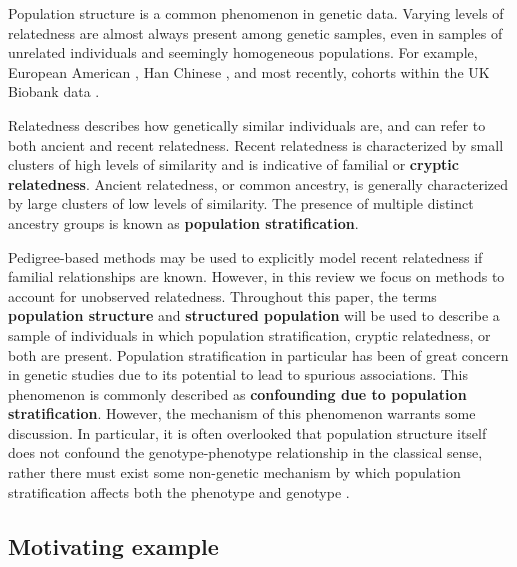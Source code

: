Population structure is a common phenomenon in genetic data. Varying levels of relatedness are almost always present among genetic samples, even in samples of unrelated individuals and seemingly homogeneous populations. For example, European American \cite{campbell2005demonstrating}, Han Chinese \cite{xu2009genomic, chen2009genetic}, and most recently, cohorts within the UK Biobank data \cite{haworth2019apparent}.

Relatedness describes how genetically similar individuals are, and can refer to both ancient and recent relatedness.  Recent relatedness is characterized by small clusters of high levels of similarity and is indicative of familial or \textbf{cryptic relatedness}. Ancient relatedness, or common ancestry, is generally characterized by large clusters of low levels of similarity. The presence of multiple distinct ancestry groups is known as \textbf{population stratification}. 

Pedigree-based methods may be used to explicitly model recent relatedness if familial relationships are known. However, in this review we focus on methods to account for unobserved relatedness. Throughout this paper, the terms \textbf{population structure} and \textbf{structured population} will be used to describe a sample of individuals in which population stratification, cryptic relatedness, or both are present. Population stratification in particular has been of great concern in genetic studies due to its potential to lead to spurious associations. This phenomenon is commonly described as \textbf{confounding due to population stratification}. However, the mechanism of this phenomenon warrants some discussion. In particular, it is often overlooked that population structure itself does not confound the genotype-phenotype relationship in the classical sense, rather there must exist some non-genetic mechanism by which population stratification affects both the phenotype and genotype \cite{barton2019population, vilhjalmsson2012nature}. \\



\subsection{Motivating example}

